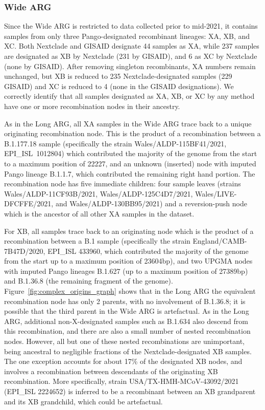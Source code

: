 \documentclass{article}
\begin{document}
\subsubsection{Wide ARG}
\label{sec-pango_x_wide_arg}
Since the Wide ARG is restricted to data collected prior
to mid-2021, it contains samples from only three Pango-designated recombinant
lineages: XA, XB, and XC. Both Nextclade and GISAID designate 44
samples as XA, while 237 samples are designated
as XB by Nextclade (231 by GISAID), and 6 as XC by Nextclade (none by GISAID).
After removing singleton recombinants, XA numbers remain unchanged, but XB is
reduced to 235 Nextclade-designated samples (229 GISAID) and XC is reduced to 4
(none in the GISAID designations). We correctly identify that all samples
designated as XA, XB, or XC by any method have one or more recombination nodes
in their ancestry.

As in the Long ARG, all XA samples in the Wide ARG trace back to a
unique originating recombination node. This is the product of a recombination
between a B.1.177.18 sample (specifically the strain Wales/ALDP-115BF41/2021,
EPI\_ISL~1012804) which contributed the majority of the genome from the start
to a maximum position of 22227, and an unknown (inserted) node with imputed
Pango lineage B.1.1.7, which contributed the remaining right hand portion. The
recombination node has five immediate children: four sample leaves (strains
Wales/ALDP-11CF93B/2021, Wales/ALDP-125C4D7/2021, Wales/LIVE-DFCFFE/2021, and
Wales/ALDP-130BB95/2021) and a reversion-push node which is the
ancestor of all other XA samples in the dataset.

For XB, all samples trace back to an originating node which is the product of a
recombination between a B.1 sample (specifically the strain
England/CAMB-7B47D/2020, EPI\_ISL 433960, which contributed the majority of
the genome from the start up to a maximum position of 23604bp), and two
UPGMA nodes with imputed Pango lineages B.1.627 (up to a maximum position of
27389bp) and B.1.36.8 (the remaining fragment of the genome). Figure~\ref{fig:complex_origins_graph}
shows that in the Long ARG the equivalent recombination node has only 2 parents,
with no involvement of  B.1.36.8; it is possible that the third parent in
the Wide ARG is artefactual. As in the Long ARG, additional
non-X-designated samples such as B.1.634 also descend from this recombination,
and there are also a small number of nested recombination nodes. However, all but
one of these nested recombinations are unimportant, being ancestral to negligible fractions
of the Nextclade-designated XB samples. The one exception accounts for about 17\% of the
designated XB nodes, and involves a recombination between descendants of the
originating XB recombination. More specifically, strain
USA/TX-HMH-MCoV-43092/2021 (EPI\_ISL 2224652) is inferred to be a recombinant
between an XB grandparent and its XB grandchild, which could be
artefactual.
\end{document}
